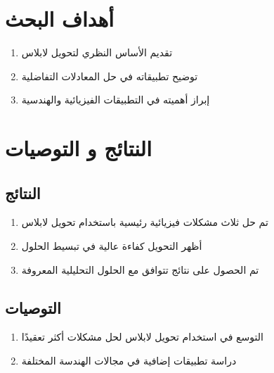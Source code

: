 \documentclass{arabicClass}
\begin{document}
	\renewcommand{\jot}{10pt}
	\abovedisplayskip=7pt
	\belowdisplayskip=7pt
	\renewcommand{\theequation}{\arabic{equation}.\arabic{chapter}}
	
	
	
	\amirifont
	
	
	
	\arabicfont
	\tableofcontents
	\clearpage
	
	
    
    \chapter*{ أهداف البحث}
    \begin{enumerate}
    	\item تقديم الأساس النظري لتحويل لابلاس
    	\item توضيح تطبيقاته في حل المعادلات التفاضلية
    	\item إبراز أهميته في التطبيقات الفيزيائية والهندسية
    \end{enumerate}
  
	
	
	
	


\chapter*{ النتائج و التوصيات}
\section*{النتائج}
\begin{enumerate}
	\item تم حل ثلاث مشكلات فيزيائية رئيسية باستخدام تحويل لابلاس
	\item أظهر التحويل كفاءة عالية في تبسيط الحلول
	\item تم الحصول على نتائج تتوافق مع الحلول التحليلية المعروفة
\end{enumerate}

\section*{التوصيات}
\begin{enumerate}
	\item التوسع في استخدام تحويل لابلاس لحل مشكلات أكثر تعقيدًا
	\item دراسة تطبيقات إضافية في مجالات الهندسة المختلفة
\end{enumerate}
	
\end{document}
